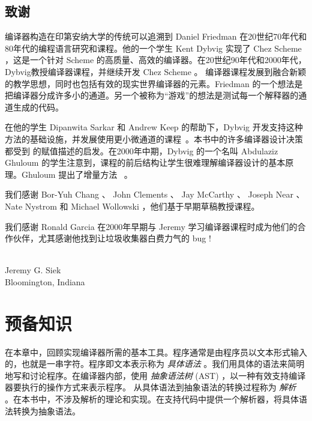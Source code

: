 \documentclass[11pt]{book}
\begin{document}
\section*{致谢}

编译器构造在印第安纳大学的传统可以追溯到 Daniel Friedman 在20世纪70年代和80年代的编程语言研究和课程。他的一个学生 Kent Dybvig 实现了
Chez Scheme~\citep{Dybvig:2006aa} ，这是一个针对 Scheme 的高质量、高效的编译器。在20世纪90年代和2000年代，Dybvig教授编译器课程，并继续开发 Chez Scheme 。
%
编译器课程发展到融合新颖的教学思想，同时也包括有效的现实世界编译器的元素。Friedman 的一个想法是把编译器分成许多小的通道。另一个被称为“游戏”的想法是测试每一个解释器的通道生成的代码。

在他的学生 Dipanwita Sarkar 和 Andrew Keep 的帮助下，Dybvig 开发支持这种方法的基础设施，并发展使用更小微通道的课程~\citep{Sarkar:2004fk,Keep:2012aa}。本书中的许多编译器设计决策都受到 \citet{Dybvig:2010aa} 的赋值描述的启发。在2000年中期，Dybvig 的一个名叫 Abdulaziz Ghuloum 的学生注意到，课程的前后结构让学生很难理解编译器设计的基本原理。Ghuloum 提出了增量方法~\citep{Ghuloum:2006bh} 。

我们感谢 Bor-Yuh Chang 、 John Clements 、 Jay McCarthy 、 Joseph Near 、 Nate
Nystrom 和 Michael Wollowski ，他们基于早期草稿教授课程。

我们感谢 Ronald Garcia 在2000年早期与 Jeremy 学习编译器课程时成为他们的合作伙伴，尤其感谢他找到让垃圾收集器白费力气的 bug !

\mbox{}\\
\noindent Jeremy G. Siek \\
Bloomington, Indiana




\chapter{预备知识}
\label{ch:trees-recur}

在本章中，回顾实现编译器所需的基本工具。程序通常是由程序员以文本形式输入的，也就是一串字符。程序即文本表示称为 \emph{具体语法} 。我们用具体的语法来简明地写和讨论程序。在编译器内部，使用
\emph{抽象语法树} (AST) ，以一种有效支持编译器要执行的操作方式来表示程序。 从具体语法到抽象语法的转换过程称为
\emph{解析}~\citep{Aho:1986qf} 。在本书中，不涉及解析的理论和实现。在支持代码中提供一个解析器，将具体语法转换为抽象语法。
\end{document}

